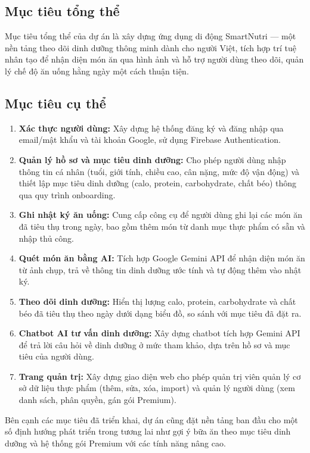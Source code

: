 \subsection{Mục tiêu tổng thể}

Mục tiêu tổng thể của dự án là xây dựng ứng dụng di động SmartNutri — một nền tảng theo dõi dinh dưỡng thông minh dành cho người Việt, tích hợp trí tuệ nhân tạo để nhận diện món ăn qua hình ảnh và hỗ trợ người dùng theo dõi, quản lý chế độ ăn uống hằng ngày một cách thuận tiện.

\subsection{Mục tiêu cụ thể}

\begin{enumerate}
    \item \textbf{Xác thực người dùng:} Xây dựng hệ thống đăng ký và đăng nhập qua email/mật khẩu và tài khoản Google, sử dụng Firebase Authentication.
    \item \textbf{Quản lý hồ sơ và mục tiêu dinh dưỡng:} Cho phép người dùng nhập thông tin cá nhân (tuổi, giới tính, chiều cao, cân nặng, mức độ vận động) và thiết lập mục tiêu dinh dưỡng (calo, protein, carbohydrate, chất béo) thông qua quy trình onboarding.
    \item \textbf{Ghi nhật ký ăn uống:} Cung cấp công cụ để người dùng ghi lại các món ăn đã tiêu thụ trong ngày, bao gồm thêm món từ danh mục thực phẩm có sẵn và nhập thủ công.
    \item \textbf{Quét món ăn bằng AI:} Tích hợp Google Gemini API để nhận diện món ăn từ ảnh chụp, trả về thông tin dinh dưỡng ước tính và tự động thêm vào nhật ký.
    \item \textbf{Theo dõi dinh dưỡng:} Hiển thị lượng calo, protein, carbohydrate và chất béo đã tiêu thụ theo ngày dưới dạng biểu đồ, so sánh với mục tiêu đã đặt ra.
    \item \textbf{Chatbot AI tư vấn dinh dưỡng:} Xây dựng chatbot tích hợp Gemini API để trả lời câu hỏi về dinh dưỡng ở mức tham khảo, dựa trên hồ sơ và mục tiêu của người dùng.
    \item \textbf{Trang quản trị:} Xây dựng giao diện web cho phép quản trị viên quản lý cơ sở dữ liệu thực phẩm (thêm, sửa, xóa, import) và quản lý người dùng (xem danh sách, phân quyền, gán gói Premium).
\end{enumerate}

Bên cạnh các mục tiêu đã triển khai, dự án cũng đặt nền tảng ban đầu cho một số định hướng phát triển trong tương lai như gợi ý bữa ăn theo mục tiêu dinh dưỡng và hệ thống gói Premium với các tính năng nâng cao.

